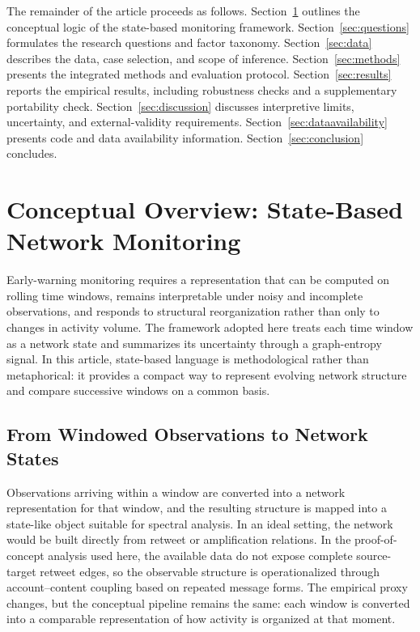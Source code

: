 \documentclass[sigconf]{acmart}
\begin{document}
The remainder of the article proceeds as follows. Section~\ref{sec:conceptual} outlines the conceptual logic of the state-based monitoring framework. Section~\ref{sec:questions} formulates the research questions and factor taxonomy. Section~\ref{sec:data} describes the data, case selection, and scope of inference. Section~\ref{sec:methods} presents the integrated methods and evaluation protocol. Section~\ref{sec:results} reports the empirical results, including robustness checks and a supplementary portability check. Section~\ref{sec:discussion} discusses interpretive limits, uncertainty, and external-validity requirements. Section~\ref{sec:dataavailability} presents code and data availability information. Section~\ref{sec:conclusion} concludes.

\section{Conceptual Overview: State-Based Network Monitoring}
\label{sec:conceptual}

Early-warning monitoring requires a representation that can be computed on rolling time windows, remains interpretable under noisy and incomplete observations, and responds to structural reorganization rather than only to changes in activity volume. The framework adopted here treats each time window as a network state and summarizes its uncertainty through a graph-entropy signal. In this article, state-based language is methodological rather than metaphorical: it provides a compact way to represent evolving network structure and compare successive windows on a common basis.

\subsection{From Windowed Observations to Network States}

Observations arriving within a window are converted into a network representation for that window, and the resulting structure is mapped into a state-like object suitable for spectral analysis. In an ideal setting, the network would be built directly from retweet or amplification relations. In the proof-of-concept analysis used here, the available data do not expose complete source-target retweet edges, so the observable structure is operationalized through account--content coupling based on repeated message forms. The empirical proxy changes, but the conceptual pipeline remains the same: each window is converted into a comparable representation of how activity is organized at that moment.
\end{document}
